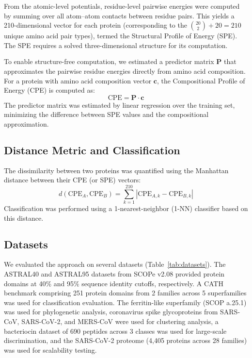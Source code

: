 \documentclass[11pt]{article}
\begin{document}
From the atomic-level potentials, residue-level pairwise energies were computed by summing over all atom--atom contacts between residue pairs. This yields a 210-dimensional vector for each protein (corresponding to the $\binom{20}{2} + 20 = 210$ unique amino acid pair types), termed the Structural Profile of Energy (SPE). The SPE requires a solved three-dimensional structure for its computation.

To enable structure-free computation, we estimated a predictor matrix $\mathbf{P}$ that approximates the pairwise residue energies directly from amino acid composition. For a protein with amino acid composition vector $\mathbf{c}$, the Compositional Profile of Energy (CPE) is computed as:
\begin{equation}
\text{CPE} = \mathbf{P} \cdot \mathbf{c}
\end{equation}
The predictor matrix was estimated by linear regression over the training set, minimizing the difference between SPE values and the compositional approximation.

\subsection{Distance Metric and Classification}

The dissimilarity between two proteins was quantified using the Manhattan distance between their CPE (or SPE) vectors:
\begin{equation}
d(\text{CPE}_A, \text{CPE}_B) = \sum_{k=1}^{210} |\text{CPE}_{A,k} - \text{CPE}_{B,k}|
\end{equation}
Classification was performed using a 1-nearest-neighbor (1-NN) classifier based on this distance.

\subsection{Datasets}

We evaluated the approach on several datasets (Table~\ref{tab:datasets}). The ASTRAL40 and ASTRAL95 datasets from SCOPe v2.08 \citep{chandonia2022} provided protein domains at 40\% and 95\% sequence identity cutoffs, respectively. A CATH benchmark \citep{sillitoe2021} comprising 251 protein domains from 2 families across 5 superfamilies was used for classification evaluation. The ferritin-like superfamily (SCOP a.25.1) was used for phylogenetic analysis, coronavirus spike glycoproteins from SARS-CoV, SARS-CoV-2, and MERS-CoV \citep{wrapp2020} were used for clustering analysis, a bacteriocin dataset of 690 peptides across 3 classes was used for large-scale discrimination, and the SARS-CoV-2 proteome (4,405 proteins across 28 families) was used for scalability testing.
\end{document}
